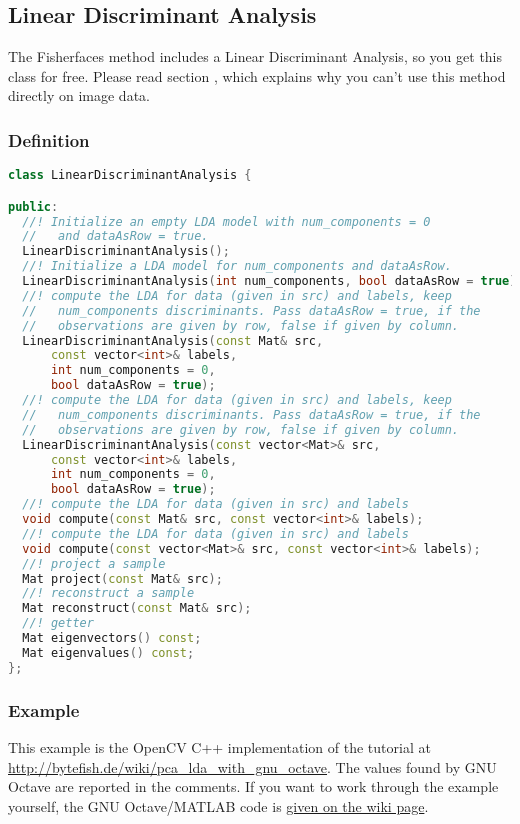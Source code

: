 \subsection{Linear Discriminant Analysis}
The Fisherfaces method includes a Linear Discriminant Analysis, so you get this class for free. Please read section \label{ssection:fisherfaces}, which explains why you can't use this method directly on image data.

\subsubsection{Definition}
\begin{lstlisting}[language=c++]
class LinearDiscriminantAnalysis {

public:
  //! Initialize an empty LDA model with num_components = 0
  //   and dataAsRow = true.
  LinearDiscriminantAnalysis();
  //! Initialize a LDA model for num_components and dataAsRow.
  LinearDiscriminantAnalysis(int num_components, bool dataAsRow = true);
  //! compute the LDA for data (given in src) and labels, keep 
  //   num_components discriminants. Pass dataAsRow = true, if the 
  //   observations are given by row, false if given by column.
  LinearDiscriminantAnalysis(const Mat& src,
      const vector<int>& labels,
      int num_components = 0,
      bool dataAsRow = true);
  //! compute the LDA for data (given in src) and labels, keep 
  //   num_components discriminants. Pass dataAsRow = true, if the 
  //   observations are given by row, false if given by column.
  LinearDiscriminantAnalysis(const vector<Mat>& src,
      const vector<int>& labels,
      int num_components = 0,
      bool dataAsRow = true);
  //! compute the LDA for data (given in src) and labels 
  void compute(const Mat& src, const vector<int>& labels);
  //! compute the LDA for data (given in src) and labels 
  void compute(const vector<Mat>& src, const vector<int>& labels);
  //! project a sample
  Mat project(const Mat& src);
  //! reconstruct a sample
  Mat reconstruct(const Mat& src);
  //! getter
  Mat eigenvectors() const;
  Mat eigenvalues() const;
};
\end{lstlisting}

\subsubsection{Example}
This example is the OpenCV C++ implementation of the tutorial at \url{http://bytefish.de/wiki/pca_lda_with_gnu_octave}. The values found by GNU Octave are reported in the comments. If you want to work through the example yourself, the GNU Octave/MATLAB code is \href{http://bytefish.de/wiki/pca_lda_with_gnu_octave}{given on the wiki page}.

